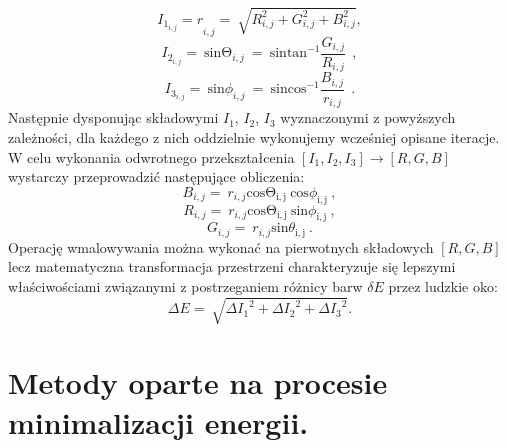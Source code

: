 \documentclass[a4paper,12pt,twoside,openany]{report}
\begin{document}
\begin{equation}
{I_{1_{i,j}}=r}_{i,j}=\ \sqrt{R^2_{i,j}+G^2_{i,j}+B^2_{i,j}}
\label{TIone}
,
\end{equation}
\begin{equation}
I_{2_{i,j}}=\ {\mathrm{sin} {\mathrm{\Theta }}_{i,j}\ }=\ {\mathrm{sin} {{\mathrm{tan}}^{-1} \frac{G_{i,j}}{R_{i,j}}\ }\ } 
\label{TItwo}
,
\end{equation}
\begin{equation}
I_{3_{i,j}}=\ {\mathrm{sin} {\phi }_{i,j}\ }=\ {\mathrm{sin} {{\mathrm{cos}}^{-1} \frac{B_{i,j}}{r_{i,j}}\ }\ } 
\label{TIthree}
.
\end{equation}
Następnie dysponując składowymi $I_1$, $I_2$, $I_3$ wyznaczonymi z powyższych zależności, dla każdego z nich oddzielnie wykonujemy wcześniej opisane iteracje. W celu wykonania odwrotnego przekształcenia $\left[I_1,I_2,I_3 \right]\to\left[R,G,B\right]$ wystarczy przeprowadzić następujące obliczenia:
\begin{equation}
 B_{i,j}=\ r_{i,j}{\mathrm{cos} {\mathrm{\Theta }}_{\mathrm{i,j}}\ }{\mathrm{cos} {\phi }_{\mathrm{i,j}}\ }
\label{TInvIone}
,
\end{equation}
\begin{equation}
R_{i,j}=\ r_{i,j}{\mathrm{cos} {\mathrm{\Theta }}_{\mathrm{i,j}}\ }{\mathrm{sin} {\phi }_{\mathrm{i,j}}\ }
\label{TInvItwo},
\end{equation}
\begin{equation}
G_{i,j}=\ r_{i,j}{\mathrm{sin} {\theta }_{\mathrm{i,j}}\ } 
\label{TInvIthree}
.
\end{equation}
Operację wmalowywania można wykonać na pierwotnych składowych $[R,G,B]$ lecz matematyczna transformacja przestrzeni charakteryzuje się lepszymi właściwościami związanymi z postrzeganiem różnicy barw $\delta E$ przez ludzkie oko:
\begin{equation}
\Delta E=\ \sqrt{{\Delta I_1}^2+{\Delta I_2}^2+{\Delta I_3}^2}
\label{deltaE}
.
\end{equation}
\chapter{Metody oparte na procesie minimalizacji energii.}
\end{document}
